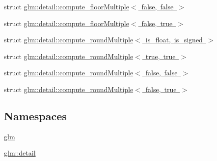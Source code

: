 \begin{DoxyCompactItemize}
\item 
struct \mbox{\hyperlink{structglm_1_1detail_1_1compute__floor_multiple_3_01false_00_01false_01_4}{glm\+::detail\+::compute\+\_\+floor\+Multiple$<$ false, false $>$}}
\item 
struct \mbox{\hyperlink{structglm_1_1detail_1_1compute__floor_multiple_3_01false_00_01true_01_4}{glm\+::detail\+::compute\+\_\+floor\+Multiple$<$ false, true $>$}}
\item 
struct \mbox{\hyperlink{structglm_1_1detail_1_1compute__round_multiple}{glm\+::detail\+::compute\+\_\+round\+Multiple$<$ is\+\_\+float, is\+\_\+signed $>$}}
\item 
struct \mbox{\hyperlink{structglm_1_1detail_1_1compute__round_multiple_3_01true_00_01true_01_4}{glm\+::detail\+::compute\+\_\+round\+Multiple$<$ true, true $>$}}
\item 
struct \mbox{\hyperlink{structglm_1_1detail_1_1compute__round_multiple_3_01false_00_01false_01_4}{glm\+::detail\+::compute\+\_\+round\+Multiple$<$ false, false $>$}}
\item 
struct \mbox{\hyperlink{structglm_1_1detail_1_1compute__round_multiple_3_01false_00_01true_01_4}{glm\+::detail\+::compute\+\_\+round\+Multiple$<$ false, true $>$}}
\end{DoxyCompactItemize}
\subsection*{Namespaces}
\begin{DoxyCompactItemize}
\item 
 \mbox{\hyperlink{namespaceglm}{glm}}
\item 
 \mbox{\hyperlink{namespaceglm_1_1detail}{glm\+::detail}}
\end{DoxyCompactItemize}
